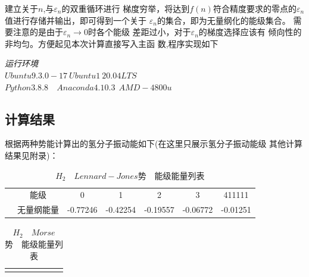 \documentclass[11pt, a4paper, oneside]{ctexart}
\begin{document}
{{{{    建立关于$n$,与$\varepsilon_n$的双重循环进行
    梯度穷举，将达到$f(n)$符合精度要求的零点的$
    \varepsilon_n$值进行存储并输出，即可得到一个关于
    $\varepsilon_n$的集合，即为无量纲化的能级集合。
    需要注意的是由于$\varepsilon_n\to 0$时各个能级
    差距过小，对于$\varepsilon_n$的梯度选择应该有
    倾向性的非均匀。方便起见本次计算直接写入主函
    数,程序实现如下
    {
    
    
    
    \begin{flushright}
    \scriptsize\emph{运行环境\\$Ubuntu 9.3.0-17\ Ubuntu1~20.04LTS$}\\
    \scriptsize\emph{$Python 3.8.8$\ \ $Anaconda 4.10.3\ \  AMD-4800u$}
        
    \end{flushright}
}

}

\subsection{计算结果}
{
    根据两种势能计算出的氢分子振动能如下(在这里只展示氢分子振动能级
    其他计算结果见附录)：
    {
\begin{table}[!h]
    \caption{$H_2 \quad Lennard-Jones$势\ \ 能级能量列表} 
    \centering
    \begin{tabular}{@{}ccccccc@{}}
    \toprule
    \centering
    \multirow{2}{*}{} & 能级    & 0        & 1        & 2        & 3        & 411111        \\ \cmidrule(){1-7} 
                                     & 无量纲能量 & -0.77246 & -0.42254 & -0.19557 & -0.06772 & -0.01251 \\ \bottomrule
    \end{tabular}
    \end{table}
    }

    {
    \begin{table}[htbp]
        \caption{$H_2\quad Morse$势\ \ 能级能量列表} 
        \centering
    \begin{tabular}{@{}ccccccc@{}}
    \toprule
    \centering
    

\end{tabular}
\end{table}}}}}}
\end{document}
